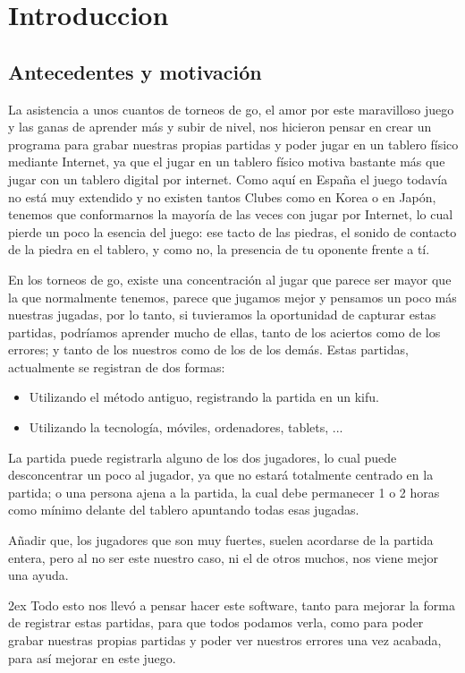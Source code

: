\documentclass[12pt,a4paper]{report}
\begin{document}
\chapter{Introduccion}

\section{Antecedentes y motivación}

La asistencia a unos cuantos de torneos de go, el amor por este maravilloso
juego y las ganas de aprender más y subir de nivel, nos hicieron pensar en crear
un programa para grabar nuestras propias partidas y poder jugar en un tablero
físico mediante Internet, ya que el jugar en un tablero físico motiva bastante
más que jugar con un tablero digital por internet. Como aquí en España el juego todavía no está muy
extendido y no existen tantos Clubes como en Korea o en Japón, tenemos que
conformarnos la mayoría de las veces con jugar por Internet, lo cual pierde un
poco la esencia del juego: ese tacto de las piedras, el sonido de contacto de la
piedra en el tablero, y como no, la presencia de tu oponente frente a tí.

En los torneos de go, existe una concentración al jugar que parece ser mayor que
la que normalmente tenemos, parece que jugamos mejor y pensamos un poco más nuestras
jugadas, por lo tanto, si tuvieramos la oportunidad de capturar estas partidas,
podríamos aprender mucho de ellas, tanto de los aciertos como de los errores; y
tanto de los nuestros como de los de los demás. 
Estas partidas, actualmente se registran de dos formas: 
\begin{itemize}
    \item Utilizando el método antiguo, registrando la partida en un kifu. 
    \item Utilizando la tecnología, móviles, ordenadores, tablets, ...
\end{itemize} 

La partida puede registrarla alguno de los dos jugadores, lo cual puede
desconcentrar un poco al jugador, ya que no estará totalmente centrado en la
partida; o una persona ajena a la partida, la cual debe permanecer 1 o 2 horas
como mínimo delante del tablero apuntando todas esas jugadas. 

Añadir que, los jugadores que son muy fuertes, suelen acordarse de la
partida entera, pero al no ser este nuestro caso, ni el de otros muchos, nos
viene mejor una ayuda. 

\parskip 2ex
Todo esto nos llevó a pensar hacer este software, tanto para mejorar la forma de
registrar estas partidas, para que todos podamos verla, como para poder grabar
nuestras propias partidas y poder ver nuestros errores una vez acabada, para así
mejorar en este juego. 
\end{document}
